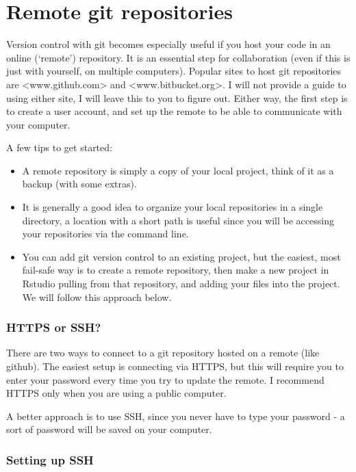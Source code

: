 \documentclass[]{book}
\providecommand{\tightlist}{%
  \setlength{\itemsep}{0pt}\setlength{\parskip}{0pt}}
\begin{document}
\hypertarget{remotegit}{%
\section{Remote git repositories}\label{remotegit}}

Version control with git becomes especially useful if you host your code in an online (`remote') repository. It is an essential step for collaboration (even if this is just with yourself, on multiple computers). Popular sites to host git repositories are \textless{}www.github.com\textgreater{} and \textless{}www.bitbucket.org\textgreater{}. I will not provide a guide to using either site, I will leave this to you to figure out. Either way, the first step is to create a user account, and set up the remote to be able to communicate with your computer.

A few tips to get started:

\begin{itemize}
\tightlist
\item
  A remote repository is simply a copy of your local project, think of it as a backup (with some extras).
\item
  It is generally a good idea to organize your local repositories in a single directory, a location with a short path is useful since you will be accessing your repositories via the command line.
\item
  You can add git version control to an existing project, but the easiest, most fail-safe way is to create a remote repository, then make a new project in Rstudio pulling from that repository, and adding your files into the project. We will follow this approach below.
\end{itemize}

\hypertarget{https-or-ssh}{%
\subsubsection{HTTPS or SSH?}\label{https-or-ssh}}

There are two ways to connect to a git repository hosted on a remote (like github). The easiest setup is connecting via HTTPS, but this will require you to enter your password every time you try to update the remote. I recommend HTTPS only when you are using a public computer.

A better approach is to use SSH, since you never have to type your password - a sort of password will be saved on your computer.

\hypertarget{setting-up-ssh}{%
\subsubsection{Setting up SSH}\label{setting-up-ssh}}
\end{document}

